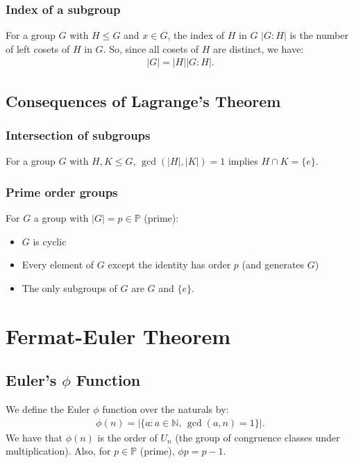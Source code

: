 \documentclass[a4paper, 12pt, twoside]{article}
\DeclareMathOperator{\Gcd}{gcd}
\begin{document}
\subsubsection{Index of a subgroup}

For a group $G$ with $H \leq G$ and $x \in G$, the index of $H$ in $G$
$|G : H|$ is the number of left cosets of $H$ in $G$. So, since
all cosets of $H$ are distinct, we have:
\begin{align*}
      |G| = |H||G : H|.
\end{align*}

\subsection{Consequences of Lagrange's Theorem}

\subsubsection{Intersection of subgroups}

For a group $G$ with $H, K \leq G$, $\Gcd(|H|, |K|) = 1$ implies
$H \cap K = \{e\}$.

\subsubsection{Prime order groups}

For $G$ a group with $|G| = p \in \mathbb{P}$ (prime):

\begin{itemize}
      \item $G$ is cyclic
      \item Every element of $G$ except the identity has order $p$ 
            (and generates $G$)
      \item The only subgroups of $G$ are $G$ and $\{e\}$.
\end{itemize}

\section{Fermat-Euler Theorem}
 
\subsection{Euler's $\phi$ Function}

We define the Euler $\phi$ function over the naturals by:
\begin{align*}
      \phi(n) = \left|\{a : a \in \mathbb{N}, \, \Gcd(a, n) = 1\}\right|.
\end{align*}
We have that $\phi(n)$ is the order of $U_n$ (the group of congruence
classes under multiplication). Also, for $p \in \mathbb{P}$ (prime),
$\phi{p} = p - 1$.
\end{document}

